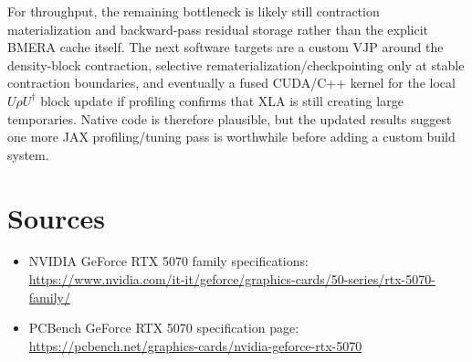 \documentclass[11pt]{article}
\begin{document}
For throughput, the remaining bottleneck is likely still contraction
materialization and backward-pass residual storage rather than the explicit BMERA
cache itself. The next software targets are a custom VJP around the density-block
contraction, selective rematerialization/checkpointing only at stable contraction
boundaries, and eventually a fused CUDA/C++ kernel for the local
\(U\rho U^\dagger\) block update if profiling confirms that XLA is still creating
large temporaries. Native code is therefore plausible, but the updated results
suggest one more JAX profiling/tuning pass is worthwhile before adding a custom
build system.

\section*{Sources}

\sloppy
\begin{itemize}
  \item NVIDIA GeForce RTX 5070 family specifications:
  \url{https://www.nvidia.com/it-it/geforce/graphics-cards/50-series/rtx-5070-family/}
  \item PCBench GeForce RTX 5070 specification page:
  \url{https://pcbench.net/graphics-cards/nvidia-geforce-rtx-5070}
\end{itemize}
\end{document}
